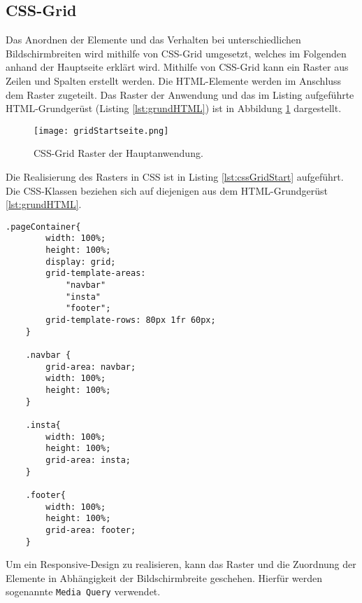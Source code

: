 \subsection{CSS-Grid}

Das Anordnen der Elemente und das Verhalten bei unterschiedlichen Bildschirmbreiten wird mithilfe von CSS-Grid umgesetzt, welches im Folgenden anhand der Hauptseite erklärt wird. 
Mithilfe von CSS-Grid kann ein Raster aus Zeilen und Spalten erstellt werden. Die HTML-Elemente werden im Anschluss dem Raster zugeteilt. 
Das Raster der Anwendung und das im Listing aufgeführte HTML-Grundgerüst (Listing \ref{lst:grundHTML}) ist in Abbildung \ref{img:gridRaster} dargestellt.

\begin{figure}[!htb]
    \centering
    \texttt{[image: gridStartseite.png]}
    \caption{CSS-Grid Raster der Hauptanwendung.}
    \label{img:gridRaster}
\end{figure}

Die Realisierung des Rasters in CSS ist in Listing \ref{lst:cssGridStart} aufgeführt. Die CSS-Klassen beziehen sich auf diejenigen aus dem HTML-Grundgerüst \ref{lst:grundHTML}.

\begin{lstlisting}[caption={Realisierung des Grid-Rasters in CSS}, label={lst:cssGridStart}, float=!htb]
    .pageContainer{
        width: 100%;
        height: 100%;
        display: grid;
        grid-template-areas:
            "navbar"
            "insta"
            "footer";
        grid-template-rows: 80px 1fr 60px;
    }

    .navbar {
        grid-area: navbar;
        width: 100%;
        height: 100%;
    }

    .insta{
        width: 100%;
        height: 100%;
        grid-area: insta;
    }

    .footer{
        width: 100%;
        height: 100%;
        grid-area: footer;
    }
\end{lstlisting}

Um ein Responsive-Design zu realisieren, kann das Raster und die Zuordnung der Elemente in Abhängigkeit der Bildschirmbreite geschehen. Hierfür werden sogenannte \texttt{Media Query} verwendet. 

